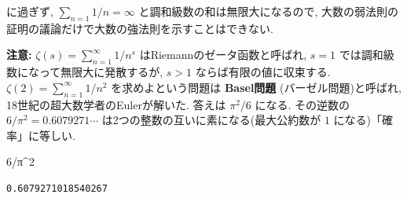 \documentclass[
  letterpaper,
  DIV=11,
  numbers=noendperiod]{scrartcl}
\newenvironment{Shaded}{\begin{snugshade}}{\end{snugshade}}
\newcommand{\ConstantTok}[1]{\textcolor[rgb]{0.56,0.35,0.01}{#1}}
\newcommand{\FloatTok}[1]{\textcolor[rgb]{0.68,0.00,0.00}{#1}}
\newcommand{\OperatorTok}[1]{\textcolor[rgb]{0.37,0.37,0.37}{#1}}
\begin{document}
に過ぎず, \(\sum_{n=1}1/n = \infty\) と調和級数の和は無限大になるので,
大数の弱法則の証明の議論だけで大数の強法則を示すことはできない.

\textbf{注意:} \(\zeta(s) = \sum_{n=1}^\infty 1/n^s\)
はRiemannのゼータ函数と呼ばれ, \(s=1\)
では調和級数になって無限大に発散するが, \(s > 1\)
ならば有限の値に収束する. \(\zeta(2) = \sum_{n=1}^\infty 1/n^2\)
を求めよという問題は \textbf{Basel問題} (バーゼル問題)と呼ばれ,
18世紀の超大数学者のEulerが解いた. 答えは \(\pi^2/6\) になる. その逆数の
\(6/\pi^2 = 0.6079271{\cdots}\) は2つの整数の互いに素になる(最大公約数が
\(1\) になる)「確率」に等しい.

\begin{Shaded}
\begin{Highlighting}[]
\FloatTok{6}\OperatorTok{/}\ConstantTok{π}\OperatorTok{\^{}}\FloatTok{2}
\end{Highlighting}
\end{Shaded}

\begin{verbatim}
0.6079271018540267
\end{verbatim}
\end{document}
